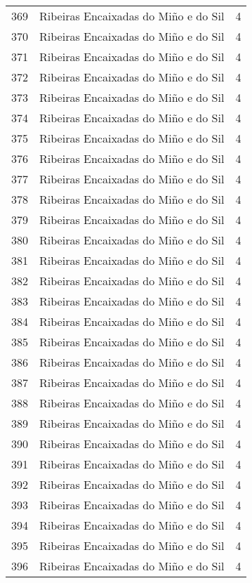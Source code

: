 \begin{table}[p]
\begin{tabular}{rlr}
  369 & Ribeiras Encaixadas do Miño e do Sil &   4 \\ 
  370 & Ribeiras Encaixadas do Miño e do Sil &   4 \\ 
  371 & Ribeiras Encaixadas do Miño e do Sil &   4 \\ 
  372 & Ribeiras Encaixadas do Miño e do Sil &   4 \\ 
  373 & Ribeiras Encaixadas do Miño e do Sil &   4 \\ 
  374 & Ribeiras Encaixadas do Miño e do Sil &   4 \\ 
  375 & Ribeiras Encaixadas do Miño e do Sil &   4 \\ 
  376 & Ribeiras Encaixadas do Miño e do Sil &   4 \\ 
  377 & Ribeiras Encaixadas do Miño e do Sil &   4 \\ 
  378 & Ribeiras Encaixadas do Miño e do Sil &   4 \\ 
  379 & Ribeiras Encaixadas do Miño e do Sil &   4 \\ 
  380 & Ribeiras Encaixadas do Miño e do Sil &   4 \\ 
  381 & Ribeiras Encaixadas do Miño e do Sil &   4 \\ 
  382 & Ribeiras Encaixadas do Miño e do Sil &   4 \\ 
  383 & Ribeiras Encaixadas do Miño e do Sil &   4 \\ 
  384 & Ribeiras Encaixadas do Miño e do Sil &   4 \\ 
  385 & Ribeiras Encaixadas do Miño e do Sil &   4 \\ 
  386 & Ribeiras Encaixadas do Miño e do Sil &   4 \\ 
  387 & Ribeiras Encaixadas do Miño e do Sil &   4 \\ 
  388 & Ribeiras Encaixadas do Miño e do Sil &   4 \\ 
  389 & Ribeiras Encaixadas do Miño e do Sil &   4 \\ 
  390 & Ribeiras Encaixadas do Miño e do Sil &   4 \\ 
  391 & Ribeiras Encaixadas do Miño e do Sil &   4 \\ 
  392 & Ribeiras Encaixadas do Miño e do Sil &   4 \\ 
  393 & Ribeiras Encaixadas do Miño e do Sil &   4 \\ 
  394 & Ribeiras Encaixadas do Miño e do Sil &   4 \\ 
  395 & Ribeiras Encaixadas do Miño e do Sil &   4 \\ 
  396 & Ribeiras Encaixadas do Miño e do Sil &   4 \\ 

\end{tabular}
\end{table}
